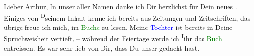 \pstart\center{}Lieber Arthur,\pend
\pstart
           In unser aller Namen danke ich Dir herzlichst für Dein neues \label{K_L03515-1v}\label{K_L03515-1h}. Einiges von \substVorne{}\textsuperscript{D}\substDazwischen{}s\substHinten{}einem Inhalt kenne ich bereits aus Zeitungen und Zeitschriften, das übrige
               freue ich mich, im \textcolor{green}{Buche}{}\ledrightnote{{$\rightarrow$}\textcolor{green}{Buch der Sprüche und Bedenken}} zu
               lesen. Meine \textcolor{blue}{Tochter}{}\ledrightnote{{$\rightarrow$}\textcolor{blue}{Franziska Goldmann}} ist
               bereits in Deine Spruchweisheit vertieft, – während der Feiertage werde ich \substVorne{}\textsuperscript{I}\substDazwischen{}i\substHinten{}hr das \textcolor{green}{Buch}{}\ledrightnote{{$\rightarrow$}\textcolor{green}{Buch der Sprüche und Bedenken}}
               entreissen. Es war sehr lieb von Dir, dass Du unser gedacht hast.\pend
           
